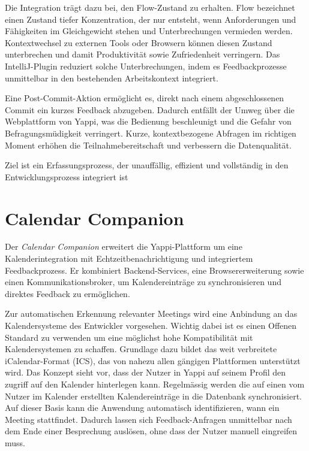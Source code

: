 \documentclass[12pt,a4paper]{report}
\begin{document}
Die Integration trägt dazu bei, den Flow-Zustand zu erhalten.
Flow bezeichnet einen Zustand tiefer Konzentration, der nur entsteht, wenn Anforderungen und Fähigkeiten
im Gleichgewicht stehen und Unterbrechungen vermieden werden.
Kontextwechsel zu externen Tools oder Browsern können diesen Zustand unterbrechen und damit Produktivität sowie Zufriedenheit verringern.
Das IntelliJ-Plugin reduziert solche Unterbrechungen, indem es Feedbackprozesse unmittelbar in den bestehenden Arbeitskontext integriert.

Eine Post-Commit-Aktion ermöglicht es, direkt nach einem abgeschlossenen Commit ein kurzes Feedback abzugeben.
Dadurch entfällt der Umweg über die Webplattform von Yappi, was die Bedienung beschleunigt und die Gefahr von Befragungsmüdigkeit verringert.
Kurze, kontextbezogene Abfragen im richtigen Moment erhöhen die Teilnahmebereitschaft und verbessern die Datenqualität.

Ziel ist ein Erfassungsprozess, der unauffällig, effizient und vollständig in den Entwicklungsprozess integriert ist




\section{Calendar Companion}

        Der \textit{Calendar Companion} erweitert die Yappi-Plattform um eine Kalenderintegration mit Echtzeitbenachrichtigung
        und integriertem Feedbackprozess. Er kombiniert Backend-Services, eine Browsererweiterung sowie einen Kommunikationsbroker,
        um Kalendereinträge zu synchronisieren und direktes Feedback zu ermöglichen.

        Zur automatischen Erkennung relevanter Meetings wird eine Anbindung an das Kalendersysteme des Entwickler vorgesehen.
        Wichtig dabei ist es einen Offenen Standard zu verwenden um eine möglichst hohe Kompatibilität mit Kalendersystemen zu schaffen.
        Grundlage dazu bildet das weit verbreitete iCalendar-Format (ICS), das von nahezu allen gängigen Plattformen unterstützt wird.
        Das Konzept sieht vor, dass der Nutzer in Yappi auf seinem Profil den zugriff auf den Kalender hinterlegen kann.
        Regelmässig werden die auf einen vom Nutzer im Kalender erstellten Kalendereinträge in die Datenbank synchronisiert.
        Auf dieser Basis kann die Anwendung automatisch identifizieren, wann ein Meeting stattfindet.
        Dadurch lassen sich Feedback-Anfragen unmittelbar nach dem Ende einer Besprechung auslösen, ohne dass der Nutzer manuell eingreifen muss.
\end{document}
